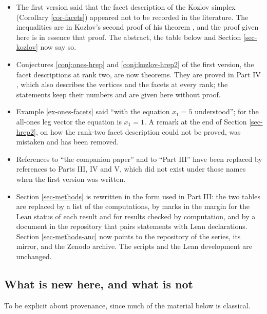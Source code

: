 \documentclass[11pt, a4paper, abstract=yes]{scrartcl}
\theoremstyle{definition}
\theoremstyle{remark}
\theoremstyle{plain}
\let\autocite\cite
\begin{document}
\begin{itemize}
\item The first version said that the facet description of the Kozlov simplex (Corollary
\ref{cor-facets}) appeared not to be recorded in the literature. The inequalities are in Kozlov's
second proof of his theorem \autocite[Section 5]{Kozlov1997}, and the proof given here is in essence
that proof. The abstract, the table below and Section \ref{sec-kozlov} now say so.
\item Conjectures \ref{conj:ones-hrep} and \ref{conj:kozlov-hrep2} of the first version, the facet
descriptions at rank two, are now theorems. They are proved in Part IV \autocite{SnellmanArticle4},
which also describes the vertices and the facets at every rank; the statements keep their numbers
and are given here without proof.
\item Example \ref{ex-ones-facets} said ``with the equation \(x_1=5\) understood''; for the all-ones leg
vector the equation is \(x_1=1\). A remark at the end of Section \ref{sec-hrep2}, on how the
rank-two facet description could not be proved, was mistaken and has been removed.
\item References to ``the companion paper'' and to ``Part III'' have been replaced by references to Parts
III, IV and V, which did not exist under those names when the first version was written.
\item Section \ref{sec-methods} is rewritten in the form used in Part III: the two tables are replaced
by a list of the computations, by marks in the margin for the Lean status of each result and for
results checked by computation, and by
a document in the repository that pairs statements with Lean declarations. Section
\ref{sec-methods-anc} now points to the repository of the series, its mirror, and the Zenodo archive.
The scripts and the Lean development are unchanged.
\end{itemize}
\subsection{What is new here, and what is not}
\label{sec:orgf7807eb}

To be explicit about provenance, since much of the material below is classical.
\end{document}
